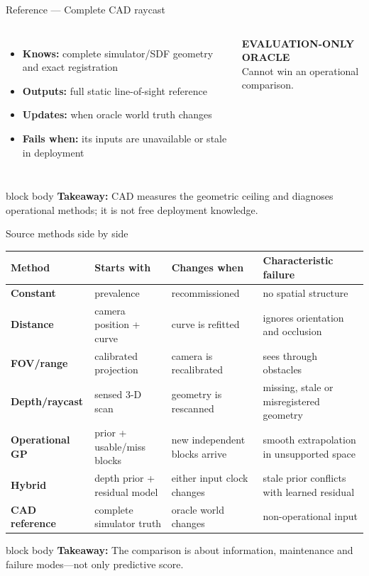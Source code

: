 \documentclass[aspectratio=169,10pt]{beamer}
\newcommand{\camera}[2]{%
  \draw[fill=Blue,draw=Navy,thick] (#1,#2) circle (0.17);
  \draw[fill=Blue!35,draw=Blue,thick] (#1+0.16,#2-0.11) -- ++(0.42,-0.22) -- ++(0,0.44) -- cycle;
}
\newcommand{\rack}[2]{%
  \draw[fill=DarkGrey!65,draw=Navy,thick] (#1,#2) rectangle ++(0.55,2.1);
}
\newcommand{\takeaway}[1]{%
  \vfill\begin{beamercolorbox}[wd=\linewidth,sep=0.12cm,rounded=true]{block body}
  \textbf{Takeaway:} #1
  \end{beamercolorbox}}
\newcommand{\methodfacts}[4]{%
  \small\begin{itemize}\setlength\itemsep{0.35em}
    \item \textbf{Knows:} #1
    \item \textbf{Outputs:} #2
    \item \textbf{Updates:} #3
    \item \textbf{Fails when:} #4
  \end{itemize}}
\begin{document}
\begin{frame}{Reference --- Complete CAD raycast}
  \begin{columns}[T,onlytextwidth]
      \methodfacts{complete simulator/SDF geometry and exact registration}{full static line-of-sight reference}{when oracle world truth changes}{its inputs are unavailable or stale in deployment}
      \vspace{0.3cm}
      \colorbox{Orange!25}{\parbox{.92\linewidth}{\centering\textbf{EVALUATION-ONLY ORACLE}\\Cannot win an operational comparison.}}
      \centering
  \end{columns}
  \takeaway{CAD measures the geometric ceiling and diagnoses operational methods; it is not free deployment knowledge.}
\end{frame}

\begin{frame}{Source methods side by side}
  \scriptsize
  \renewcommand{\arraystretch}{1.22}
  \begin{tabular}{>{\raggedright\arraybackslash\bfseries}p{2.15cm}>{\raggedright\arraybackslash}p{3.45cm}>{\raggedright\arraybackslash}p{3.2cm}>{\raggedright\arraybackslash}p{4.1cm}}
    \toprule
    Method & Starts with & Changes when & Characteristic failure \\
    \midrule
    Constant & prevalence & recommissioned & no spatial structure \\
    Distance & camera position + curve & curve is refitted & ignores orientation and occlusion \\
    FOV/range & calibrated projection & camera is recalibrated & sees through obstacles \\
    Depth/raycast & sensed 3-D scan & geometry is rescanned & missing, stale or misregistered geometry \\
    Operational GP & prior + usable/miss blocks & new independent blocks arrive & smooth extrapolation in unsupported space \\
    Hybrid & depth prior + residual model & either input clock changes & stale prior conflicts with learned residual \\
    CAD reference & complete simulator truth & oracle world changes & non-operational input \\
    \bottomrule
  \end{tabular}
  \takeaway{The comparison is about information, maintenance and failure modes---not only predictive score.}
\end{frame}
\end{document}
